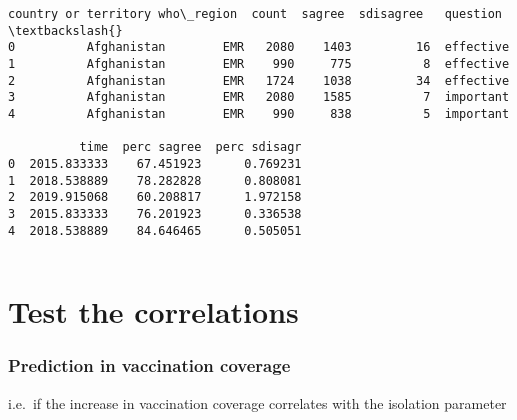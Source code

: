 \documentclass[11pt]{article}
\makeatletter
\newcommand{\boxspacing}{\kern\kvtcb@left@rule\kern\kvtcb@boxsep}
\newcommand{\prompt}[4]{
        {\ttfamily\llap{{\color{#2}[#3]:\hspace{3pt}#4}}\vspace{-\baselineskip}}
    }
\makeatother
\begin{document}
            \begin{tcolorbox}[breakable, size=fbox, boxrule=.5pt, pad at break*=1mm, opacityfill=0]
\prompt{Out}{outcolor}{20}{\boxspacing}
\begin{Verbatim}[commandchars=\\\{\}]
  country or territory who\_region  count  sagree  sdisagree   question  \textbackslash{}
0          Afghanistan        EMR   2080    1403         16  effective
1          Afghanistan        EMR    990     775          8  effective
2          Afghanistan        EMR   1724    1038         34  effective
3          Afghanistan        EMR   2080    1585          7  important
4          Afghanistan        EMR    990     838          5  important

          time  perc sagree  perc sdisagr
0  2015.833333    67.451923      0.769231
1  2018.538889    78.282828      0.808081
2  2019.915068    60.208817      1.972158
3  2015.833333    76.201923      0.336538
4  2018.538889    84.646465      0.505051
\end{Verbatim}
\end{tcolorbox}
        
    \begin{tcolorbox}[breakable, size=fbox, boxrule=1pt, pad at break*=1mm,colback=cellbackground, colframe=cellborder]
\prompt{In}{incolor}{ }{\boxspacing}
\begin{Verbatim}[commandchars=\\\{\}]

\end{Verbatim}
\end{tcolorbox}

    \hypertarget{test-the-correlations}{%
\section{Test the correlations}\label{test-the-correlations}}

    \hypertarget{prediction-in-vaccination-coverage}{%
\subsubsection{Prediction in vaccination
coverage}\label{prediction-in-vaccination-coverage}}

i.e.~if the increase in vaccination coverage correlates with the
isolation parameter
\end{document}
